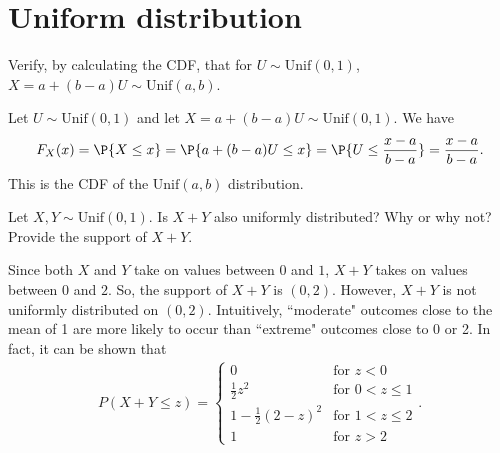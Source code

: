 \section{Uniform distribution}
\label{sec:section-5.5}
	
	\begin{exercise}
		Verify, by calculating the CDF, that for $U \sim \text{Unif}(0,1)$, $X = a + (b - a) U \sim \text{Unif}(a,b)$.
		\begin{solution}
			Let $U \sim \text{Unif}(0,1)$ and let $X = a + (b - a) U \sim \text{Unif}(0,1)$. We have
			\begin{align*}
				F_X(x) = \P{X \leq x} = \P{a + (b - a) U \leq x} = \P{U \leq \frac{x - a}{b - a}} = \frac{x - a}{b - a}.
			\end{align*}
			This is the CDF of the $\text{Unif}(a, b)$ distribution.
		\end{solution}
	\end{exercise}
	
	\begin{exercise}\label{ex:chap05:03}
		Let $X, Y \sim \text{Unif}(0,1)$. Is $X + Y$ also uniformly distributed? Why or why not? Provide the support of $X + Y$.
		\begin{solution}
			Since both $X$ and $Y$ take on values between $0$ and $1$, $X + Y$ takes on values between $0$ and $2$. So, the support of $X + Y$ is $(0,2)$. However, $X + Y$ is not uniformly distributed on $(0,2)$. Intuitively, ``moderate" outcomes close to the mean of 1 are more likely to occur than ``extreme" outcomes close to 0 or 2. In fact, it can be shown that
			\begin{align*}
				P(X + Y \leq z) =
				\begin{cases}
					0 & \text{for } z < 0 \\
					\frac{1}{2} z^2 & \text{for } 0 < z \leq 1 \\
					1 - \frac{1}{2} (2 - z)^2 & \text{for } 1 < z \leq 2 \\
					1 & \text{for } z > 2
				\end{cases}.
			\end{align*}
		\end{solution}
	\end{exercise}
	
